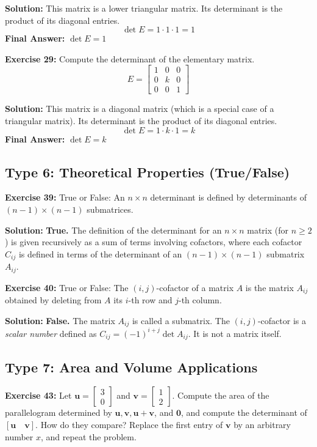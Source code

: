 \documentclass{article}
\begin{document}
\textbf{Solution:}
This matrix is a lower triangular matrix. Its determinant is the product of its diagonal entries.
\[ \det E = 1 \cdot 1 \cdot 1 = 1 \]
\textbf{Final Answer:} $\det E = 1$

\vspace{0.5cm}
\textbf{Exercise 29:} Compute the determinant of the elementary matrix.
\[ E = \begin{bmatrix} 1 & 0 & 0 \\ 0 & k & 0 \\ 0 & 0 & 1 \end{bmatrix} \]

\textbf{Solution:}
This matrix is a diagonal matrix (which is a special case of a triangular matrix). Its determinant is the product of its diagonal entries.
\[ \det E = 1 \cdot k \cdot 1 = k \]
\textbf{Final Answer:} $\det E = k$

\subsection{Type 6: Theoretical Properties (True/False)}

\textbf{Exercise 39:} True or False: An $n \times n$ determinant is defined by determinants of $(n-1) \times (n-1)$ submatrices.

\textbf{Solution:}
\textbf{True.} The definition of the determinant for an $n \times n$ matrix (for $n \ge 2$) is given recursively as a sum of terms involving cofactors, where each cofactor $C_{ij}$ is defined in terms of the determinant of an $(n-1) \times (n-1)$ submatrix $A_{ij}$.

\vspace{0.5cm}
\textbf{Exercise 40:} True or False: The $(i, j)$-cofactor of a matrix $A$ is the matrix $A_{ij}$ obtained by deleting from $A$ its $i$-th row and $j$-th column.

\textbf{Solution:}
\textbf{False.} The matrix $A_{ij}$ is called a submatrix. The $(i, j)$-cofactor is a \textit{scalar number} defined as $C_{ij} = (-1)^{i+j} \det A_{ij}$. It is not a matrix itself.

\subsection{Type 7: Area and Volume Applications}

\textbf{Exercise 43:} Let $\mathbf{u} = \begin{bmatrix} 3 \\ 0 \end{bmatrix}$ and $\mathbf{v} = \begin{bmatrix} 1 \\ 2 \end{bmatrix}$. Compute the area of the parallelogram determined by $\mathbf{u}, \mathbf{v}, \mathbf{u}+\mathbf{v}$, and $\mathbf{0}$, and compute the determinant of $[\mathbf{u} \quad \mathbf{v}]$. How do they compare? Replace the first entry of $\mathbf{v}$ by an arbitrary number $x$, and repeat the problem.
\end{document}
